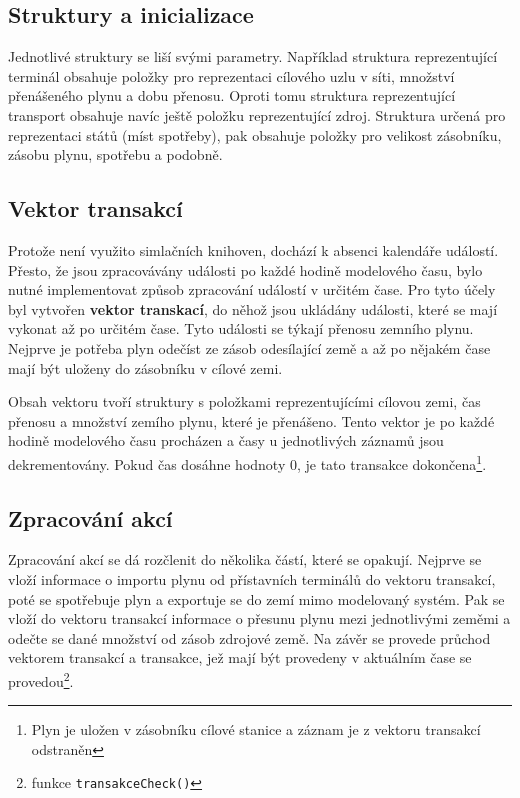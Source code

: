 \documentclass[a4paper,11pt]{article}
\begin{document}
\subsection{Struktury a inicializace}

Jednotlivé struktury se liší svými parametry.
Například struktura reprezentující terminál obsahuje položky pro reprezentaci cílového uzlu v síti,
množství přenášeného plynu a dobu přenosu.
Oproti tomu struktura reprezentující transport obsahuje navíc ještě položku reprezentující zdroj.
Struktura určená pro reprezentaci států (míst spotřeby), pak obsahuje položky pro velikost zásobníku,
zásobu plynu, spotřebu a podobně.

\subsection{Vektor transakcí}

Protože není využito simlačních knihoven, dochází k absenci kalendáře událostí.
Přesto, že jsou zpracovávány události po každé hodině modelového času,
bylo nutné implementovat způsob zpracování událostí v určitém čase.
Pro tyto účely byl vytvořen \textbf{vektor transkací}, do něhož jsou ukládány události,
které se mají vykonat až po určitém čase.
Tyto události se týkají přenosu zemního plynu.
Nejprve je potřeba plyn odečíst ze zásob odesílající země a až po nějakém čase mají být uloženy do zásobníku v cílové zemi.

Obsah vektoru tvoří struktury s položkami reprezentujícími cílovou zemi, čas přenosu a množství zemího plynu, které je přenášeno. Tento vektor je po každé hodině modelového času procházen a časy u jednotlivých záznamů jsou dekrementovány. Pokud čas dosáhne hodnoty 0, je tato transakce dokončena\footnote{Plyn je uložen v zásobníku cílové stanice a záznam je z vektoru transakcí odstraněn}. 

\subsection{Zpracování akcí}

Zpracování akcí se dá rozčlenit do několika částí, které se opakují. Nejprve se vloží informace o importu plynu od přístavních terminálů do vektoru transakcí, poté se spotřebuje plyn a exportuje se do zemí mimo modelovaný systém. Pak se vloží do vektoru transakcí informace o přesunu plynu mezi jednotlivými zeměmi a odečte se dané množství od zásob zdrojové země. Na závěr se provede průchod vektorem transakcí a transakce, jež mají být provedeny v aktuálním čase se provedou\footnote{funkce \texttt{transakceCheck()}}. 
\end{document}
